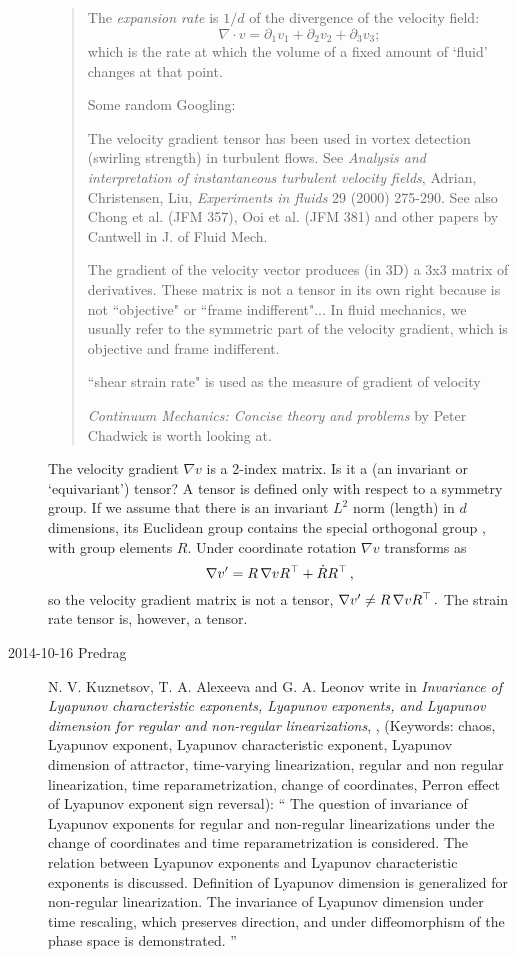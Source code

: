 \begin{description}
\begin{quote}
The \emph{expansion rate}  is $1/d$ of the divergence of the velocity field:
\[
    \nabla \cdot v = \partial_1 v_1 + \partial_2 v_2 + \partial_3 v_3;
\]
which is the rate at which the volume of a fixed amount of `fluid'
changes at that point.

Some random Googling:

The velocity gradient tensor has been used in vortex detection (swirling
strength) in turbulent flows. See
\emph{Analysis and interpretation of instantaneous turbulent velocity fields},
 Adrian, Christensen, Liu, \emph{Experiments in fluids} 29 (2000) 275-290.
 See also  Chong et al. (JFM 357), Ooi et al. (JFM 381) and other papers
 by Cantwell in J. of Fluid Mech.

The gradient of the velocity vector produces (in 3D) a 3x3 matrix of
derivatives. These matrix is not a tensor in its own right because is not
``objective" or ``frame indifferent"... In fluid mechanics, we usually
refer to the symmetric part of the velocity gradient, which is objective
and frame indifferent.

``shear strain rate" is used as the measure of gradient of velocity

\emph{Continuum Mechanics: Concise theory and problems}
by Peter Chadwick is worth looking at.
\end{quote}

The velocity gradient $\nabla v$ is a 2-index matrix. Is it a (an
invariant or `equivariant') tensor? A tensor is defined only with respect
to a symmetry group. If we assume that there is an invariant $L^2$ norm
(length) in $d$ dimensions, its Euclidean group contains the special
orthogonal group , with group elements $R$. Under coordinate
rotation $\nabla v$ transforms as
\[
\nabla v' = R\,\nabla v {R}{}^\top + \dot{R}{R}{}^\top
\,,
\]
so the velocity gradient matrix is not a tensor,
\(
\nabla v' \neq R\,\nabla v {R}{}^\top
\,.
\)
The {strain rate tensor}  is, however, a tensor.

\item[2014-10-16 Predrag]
N. V. Kuznetsov, T. A. Alexeeva and G. A. Leonov write in \emph{Invariance
of Lyapunov characteristic exponents, Lyapunov exponents, and Lyapunov
dimension for regular and non-regular linearizations},
,
(Keywords: chaos, Lyapunov exponent, Lyapunov characteristic exponent,
Lyapunov dimension of attractor, time-varying linearization, regular and
non regular linearization, time reparametrization, change of coordinates,
Perron effect of Lyapunov exponent sign reversal):
``
The question of invariance of Lyapunov exponents for regular and
non-regular linearizations under the change of coordinates and time
reparametrization is considered. The relation between Lyapunov exponents and
Lyapunov characteristic exponents is discussed. Definition of Lyapunov
dimension is generalized for non-regular linearization. The invariance of
Lyapunov dimension under time rescaling, which preserves direction, and
under diffeomorphism of the phase space is demonstrated.
''


\end{description}
